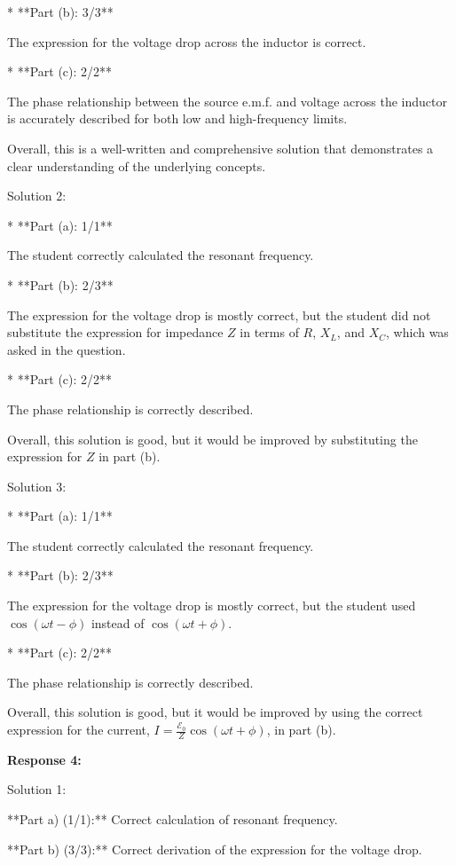 \documentclass[a4paper,11pt]{article}
\begin{document}
*   **Part (b): 3/3**

    The expression for the voltage drop across the inductor is correct.

*   **Part (c): 2/2**

    The phase relationship between the source e.m.f. and voltage across the inductor is accurately described for both low and high-frequency limits.

Overall, this is a well-written and comprehensive solution that demonstrates a clear understanding of the underlying concepts.

Solution 2:

*   **Part (a): 1/1**

    The student correctly calculated the resonant frequency.

*   **Part (b): 2/3**

    The expression for the voltage drop is mostly correct, but the student did not substitute the expression for impedance \(Z\) in terms of \(R\), \(X_L\), and \(X_C\), which was asked in the question. 

*   **Part (c): 2/2**

    The phase relationship is correctly described.

Overall, this solution is good, but it would be improved by substituting the expression for \(Z\) in part (b).

Solution 3:

*   **Part (a): 1/1**

    The student correctly calculated the resonant frequency.

*   **Part (b): 2/3**

    The expression for the voltage drop is mostly correct, but the student used \( \cos(\omega t - \phi) \) instead of \( \cos(\omega t + \phi) \).

*   **Part (c): 2/2**

    The phase relationship is correctly described.

Overall, this solution is good, but it would be improved by using the correct expression for the current, \( I = \frac{\mathcal{E}_{0}}{Z} \cos(\omega t + \phi) \), in part (b).

\bigskip    
\textbf{Response 4:}

Solution 1:

**Part a) (1/1):** Correct calculation of resonant frequency.

**Part b) (3/3):** Correct derivation of the expression for the voltage drop.
\end{document}

